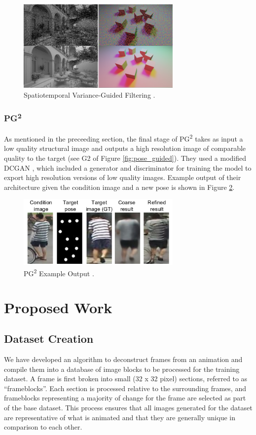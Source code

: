 \documentclass[letterpaper]{article} %
\begin{document}
\begin{figure}[htbp]
\centerline{\includegraphics[width=8cm]{spatiotemporal.png}}
\caption{Spatiotemporal Variance-Guided Filtering \cite{spatiotemporal}.}
\label{fig:spatiotemporal}
\end{figure}

\subsubsection{PG\textsuperscript{2}}
As mentioned in the preceeding section,
the final stage of PG\textsuperscript{2} \cite{pose_guided_image_generation}
takes as input a low quality structural image and
outputs a high resolution image of comparable quality to the target
(see G2 of Figure \ref{fig:pose_guided}).
They used a modified DCGAN \cite{unsupervised_learning}, which included
a generator and discriminator for training the model to export
high resolution versions of low quality images.
Example output of their architecture given the condition image and a new pose
is shown in Figure \ref{fig:pg2_results}.

\begin{figure}[htbp]
\centerline{\includegraphics[width=8cm]{pg2_results.png}}
\caption{PG\textsuperscript{2} Example Output \cite{pose_guided_image_generation}.}
\label{fig:pg2_results}
\end{figure}

\section{Proposed Work}
\label{sec:proposed_work}
\subsection{Dataset Creation}
\label{subsec:data}
We have developed an algorithm to deconstruct frames from an animation
and compile them into a database of image blocks to be processed for the
training dataset.
A frame is first broken into
small (32 x 32 pixel) sections, referred to as ``frameblocks''.
Each section is processed relative to the surrounding frames,
and frameblocks representing a majority of change
for the frame are selected as part of the base dataset.
This process ensures that all images generated for the dataset
are representative of what is animated and that they are generally unique
in comparison to each other.
\end{document}
